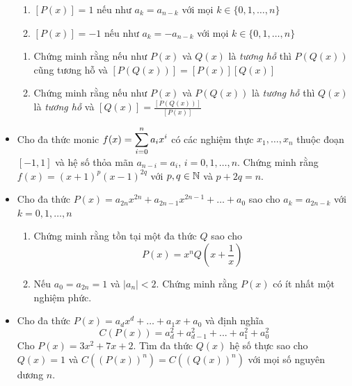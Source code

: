 \documentclass[11pt]{scrartcl}
\begin{document}
\begin{itemize}[label=, leftmargin=0em, itemsep=-0em]
\begin{btvn}
\begin{enumerate}
                \item $[P(x)] = 1$ nếu như $a_k = a_{n - k}$ với mọi $k \in \{0,1,\dots,n\}$
                \item $[P(x)] = -1$ nếu như $a_k = -a_{n - k}$ với mọi $k \in \{0,1,\dots,n\}$
            \end{enumerate}
            \begin{enumerate}[label=(\alph*)]
                \item Chứng minh rằng nếu như $P(x)$ và $Q(x)$ là \textit{tương hỗ} thì $P(Q(x))$ cũng tương hỗ và $[P(Q(x))] = [P(x)][Q(x)]$
                \item Chứng minh rằng nếu như $P(x)$ và $P(Q(x))$ là \textit{tương hỗ} thì $Q(x)$ là \textit{tương hỗ} và $[Q(x)] = \frac{[P(Q(x))]}{[P(x)]}$
            \end{enumerate}
        \end{btvn} 
        \item \begin{btvn} Cho đa thức monic $f(x) = \displaystyle\sum_{i = 0}^n a_ix^i$ có các nghiệm thực $x_1,\dots,x_n$ thuộc đoạn $[-1,1]$ và hệ số thỏa mãn $a_{n - i} = a_i$, $i = 0,1,\dots,n$. Chứng minh rằng $f(x) = (x + 1)^p(x - 1)^{2q}$ với $p,q \in \mathbb{N}$ và $p + 2q = n$.
        \end{btvn}
        \item \begin{btvn} Cho đa thức $P(x) = a_{2n}x^{2n} + a_{2n - 1}x^{2n - 1} +\dots + a_0$ sao cho $a_k = a_{2n - k}$ với $k = 0,1,\dots,n$
        \begin{enumerate}[label=(\alph*)]
            \item Chứng minh rằng tồn tại một đa thức $Q$ sao cho 
            \[  
                P(x) = x^nQ\left(x + \frac{1}{x}\right)
            \]
            \item Nếu $a_0 = a_{2n} = 1$ và $|a_{n}| < 2$. Chứng minh rằng $P(x)$ có ít nhất một nghiệm phức.
        \end{enumerate}
        \end{btvn}
        \item \begin{btvn}
            Cho đa thức $P(x) = a_dx^d + \dots + a_1 x + a_0$ và định nghĩa
            \[
                C(P(x)) = a_d^2 + a_{d - 1}^2 + ... + a_1^2 + a_0^2
            \]
            Cho $P(x) = 3x^2 + 7x + 2$. Tìm đa thức $Q(x)$ hệ số thực sao cho $Q(x) = 1$ và $C((P(x))^n) = C((Q(x))^n)$ với mọi số nguyên dương $n$.
        \end{btvn}

\end{itemize}
\end{document}
